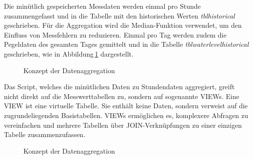 
\newpage
Die minütlich gespeicherten Messdaten werden einmal pro Stunde zusammengefasst und in die Tabelle mit den historischen Werten \emph{tblhistorical} geschrieben. Für die Aggregation wird die Median-Funktion verwendet, um den Einfluss von Messfehlern zu reduzieren. Einmal pro Tag werden zudem die Pegeldaten des gesamten Tages gemittelt und in die Tabelle \emph{tblwaterlevelhistorical} geschrieben, wie in Abbildung\,\ref{img:historical} dargestellt.

\begin{figure}[htbp!]
	\centering
	\caption{Konzept der Datenaggregation}
	\label{img:historical}
\end{figure}


\noindent
Das Script, welches die minütlichen Daten zu Stundendaten aggregiert, greift nicht direkt auf die Messwerttabellen zu, sondern auf sogenannte VIEWs. Eine VIEW ist eine virtuelle Tabelle. Sie enthält keine Daten, sondern verweist auf die zugrundeliegenden Basistabellen. VIEWs ermöglichen es, komplexere Abfragen zu vereinfachen und mehrere Tabellen über JOIN-Verknüpfungen zu einer einzigen Tabelle zusammenzufassen.

\begin{figure}[htbp!]
	\centering
	\caption{Konzept der Datenaggregation}
	\label{img:leftjoin}
\end{figure}

